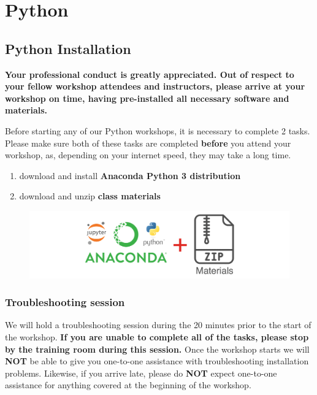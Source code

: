 \documentclass[]{book}
\providecommand{\tightlist}{%
  \setlength{\itemsep}{0pt}\setlength{\parskip}{0pt}}
\begin{document}
\part{Python}\label{part-python}

\chapter{Python Installation}\label{python-installation}

\textbf{Your professional conduct is greatly appreciated. Out of respect
to your fellow workshop attendees and instructors, please arrive at your
workshop on time, having pre-installed all necessary software and
materials.}

Before starting any of our Python workshops, it is necessary to complete
2 tasks. Please make sure both of these tasks are completed
\textbf{before} you attend your workshop, as, depending on your internet
speed, they may take a long time.

\begin{enumerate}
\def\labelenumi{\arabic{enumi}.}
\tightlist
\item
  download and install \textbf{Anaconda Python 3 distribution}
\item
  download and unzip \textbf{class materials}
\end{enumerate}

\begin{figure}
\centering
\includegraphics{Python/PythonInstall/images/install_software_Python.png}
\caption{}
\end{figure}

\section{Troubleshooting session}\label{troubleshooting-session-1}

We will hold a troubleshooting session during the 20 minutes prior to
the start of the workshop. \textbf{If you are unable to complete all of
the tasks, please stop by the training room during this session.} Once
the workshop starts we will \textbf{NOT} be able to give you one-to-one
assistance with troubleshooting installation problems. Likewise, if you
arrive late, please do \textbf{NOT} expect one-to-one assistance for
anything covered at the beginning of the workshop.
\end{document}
